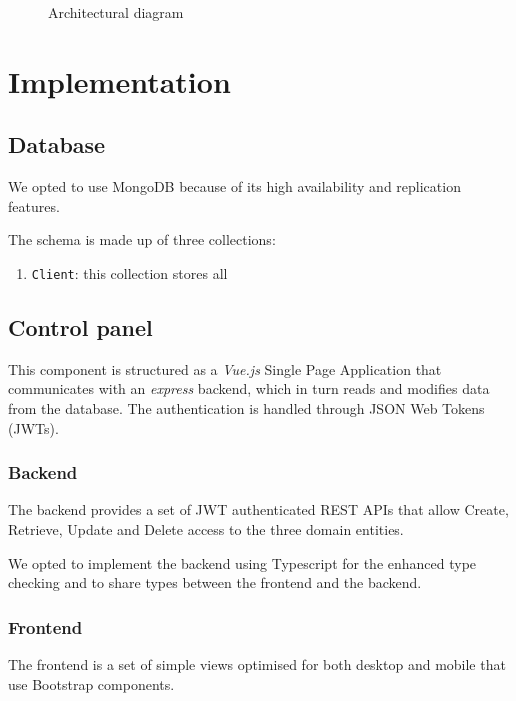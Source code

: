\documentclass{scrartcl}
\begin{document}
\begin{figure} %
    \centering
    
    \caption{Architectural diagram}
    \label{fig:arch} 
\end{figure}

\section{Implementation}

\subsection{Database}
\par We opted to use MongoDB because of its high availability and replication features.
\par The schema is made up of three collections:
\begin{enumerate}
    \item \texttt{Client}: this collection stores all
\end{enumerate}

\subsection{Control panel}

\par This component is structured as a \textit{Vue.js} Single Page Application that communicates with an \textit{express} backend, which in turn reads and modifies data from the database. The authentication is handled through JSON Web Tokens (JWTs).
\subsubsection{Backend}
\par The backend provides a set of JWT authenticated REST APIs that allow Create, Retrieve, Update and Delete access to the three domain entities.
\par We opted to implement the backend using Typescript for the enhanced type checking and to share types between the frontend and the backend.
\subsubsection{Frontend}
\par The frontend is a set of simple views optimised for both desktop and mobile that use Bootstrap components.
\end{document}
